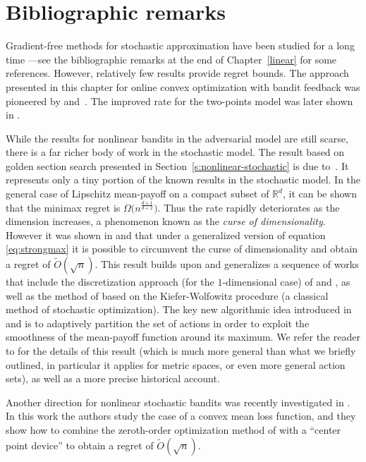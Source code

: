 \documentclass[11pt]{hackednow}
\newcommand{\R}{\mathbb{R}}
\renewcommand{\tilde}{\widetilde}
\begin{document}
\section{Bibliographic remarks}
Gradient-free methods for stochastic approximation have been studied for a long time ---see the bibliographic remarks at the end of Chapter~\ref{linear} for some references. However, relatively few results provide regret bounds. The approach presented in this chapter for online convex optimization with bandit feedback was pioneered by \citep{FKM05} and~\citep{kleinberg2004nearly}. The improved rate for the two-points model was later shown in \cite{ADX10}. 

While the results for nonlinear bandits in the adversarial model are still scarse, there is a far richer body of work in the stochastic model. The result based on golden section search presented in Section~\ref{s:nonlinear-stochastic} is due to~\citep{yu2011unimodal}. It represents only a tiny portion of the known results in the stochastic model. In the general case of Lipschitz mean-payoff on a compact subset of $\R^d$, it can be shown that the minimax regret is $\Omega\bigl(n^{\frac{d+1}{d+2}}\bigr)$. Thus the rate rapidly deteriorates as the dimension increases, a phenomenon known as the {\em curse of dimensionality}. However it was shown in \citep{KSU08} and \citep{BMSS09} that under a generalized version of equation \eqref{eq:strongmax} it is possible to circumvent the curse of dimensionality and obtain a regret of $\tilde{O}(\sqrt{n})$. This result builds upon and generalizes a sequence of works that include the discretization approach (for the $1$-dimensional case) of \citep{kleinberg2004nearly} and \citep{auer2007improved}, as well as the method of \citep{cope2009regret} based on the Kiefer-Wolfowitz procedure (a classical method of stochastic optimization). The key new algorithmic idea introduced in \citep{KSU08} and \citep{BMSS09}  is to adaptively partition the set of actions in order to exploit the smoothness of the mean-payoff function around its maximum. We refer the reader to \cite{BMSS11} for the details of this result (which is much more general than what we briefly outlined, in particular it applies for metric spaces, or even more general action sets), as well as a more precise historical account. 

Another direction for nonlinear stochastic bandits was recently investigated in \citep{agarwal2011stochastic}. In this work the authors study the case of a convex mean loss function, and they show how to combine the zeroth-order optimization method of \citep{NY83} with a ``center point device'' to obtain a regret of $\tilde{O}(\sqrt{n})$.
\end{document}
